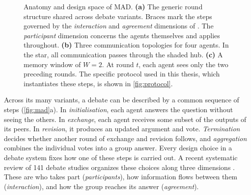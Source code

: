 \begin{figure}[t]
  \caption[Anatomy and design space of \acs{MAD}]{Anatomy and design space of \acs{MAD}. \textbf{(a)} The
    generic round structure shared across debate variants. Braces mark the steps
    governed by the \emph{interaction} and \emph{agreement} dimensions of
    \citet{motger2026taxonomy}. The \emph{participant} dimension concerns the
    agents themselves and applies throughout. \textbf{(b)} Three communication
    topologies for four agents. In the star, all communication passes through
    the shaded hub. \textbf{(c)} A memory window of $W = 2$. At round $t$, each
    agent sees only the two preceding rounds. The specific protocol used in this
    thesis, which instantiates these steps, is shown in \autoref{fig:protocol}.}
  \label{fig:mad}
\end{figure}

Across its many variants, a debate can be described by a common sequence of
steps (\autoref{fig:mad}a). In \emph{initialisation}, each agent answers the
question without seeing the others. In \emph{exchange}, each agent receives some
subset of the outputs of its peers. In \emph{revision}, it produces an updated
argument and vote. \emph{Termination} decides whether another round of exchange
and revision follows, and \emph{aggregation} combines the individual votes into
a group answer. Every design choice in a debate system fixes how one of these
steps is carried out. A recent systematic review of 141 debate studies
organizes these choices along three dimensions \citep{motger2026taxonomy}. These
are who takes part (\emph{participants}), how information flows between them
(\emph{interaction}), and how the group reaches its answer (\emph{agreement}).

